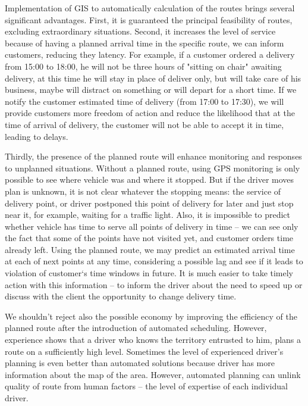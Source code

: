 Implementation of GIS to automatically calculation of the routes brings several significant advantages. First, it is guaranteed the principal feasibility of routes, excluding extraordinary situations. Second, it increases the level of service because of having a planned arrival time in the specific route, we can inform customers, reducing they latency. For example, if a customer ordered a delivery from 15:00 to 18:00, he will not be three hours of "sitting on chair" awaiting delivery, at this time he will stay in place of deliver only, but will take care of his business, maybe will distract on something or will depart for a short time. If we notify the customer estimated time of delivery (from 17:00 to 17:30), we will provide customers more freedom of action and reduce the likelihood that at the time of arrival of delivery, the customer will not be able to accept it in time, leading to delays.

Thirdly, the presence of the planned route will enhance monitoring and responses to unplanned situations. Without a planned route, using GPS monitoring is only possible to see where vehicle was and where it stopped. But if the driver moves plan is unknown, it is not clear whatever the stopping means: the service of delivery point, or driver postponed this point of delivery for later and just stop near it, for example, waiting for a traffic light. Also, it is impossible to predict whether vehicle has time to serve all points of delivery in time – we can see only the fact that some of the points have not visited yet, and customer orders time already left. Using the planned route, we may predict an estimated arrival time at each of next points at any time, considering a possible lag and see if it leads to violation of customer`s time windows in future. It is much easier to take timely action with this information – to inform the driver about the need to speed up or discuss with the client the opportunity to change delivery time.

We shouldn't reject also the possible economy by improving the efficiency of the planned route after the introduction of automated scheduling. However, experience shows that a driver who knows the territory entrusted to him, plans a route on a sufficiently high level. Sometimes the level of experienced driver’s planning is even better than automated solutions because driver has more information about the map of the area. However, automated planning can unlink quality of route from human factors – the level of expertise of each individual driver.

